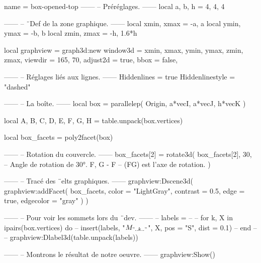 \documentclass[border = 3pt]{standalone}
\begin{document}
\begin{luadraw*}{name = box-opened-top}
------
-- Préréglages.
------
local a, b, h = 4, 4, 4

------
-- ¨Def de la zone graphique.
------
local xmin, xmax = -a, a
local ymin, ymax = -b, b
local zmin, zmax = -h, 1.6*h

local graphview = graph3d:new{
  window3d = {xmin, xmax, ymin, ymax, zmin, zmax},
  viewdir = {165, 70},
  adjust2d = true,
  bbox     = false,
}

------
-- Réglages liés aux lignes.
------
Hiddenlines     = true
Hiddenlinestyle = "dashed"

------
-- La boîte.
------
local box = parallelep(
  Origin,
  a*vecI, a*vecJ, h*vecK
)

local A, B, C, D, E, F, G, H = table.unpack(box.vertices)

local box_facets = poly2facet(box)

------
-- Rotation du couvercle.
------
box_facets[2] = rotate3d(
  box_facets[2],
  30,         -- Angle de rotation de 30°.
  {F, G - F}  -- (FG) est l'axe de rotation.
)

------
-- Tracé des ¨elts graphiques.
------
graphview:Dscene3d(
  graphview:addFacet(
    box_facets,
    {
      color     = "LightGray",
      contrast  = 0.5,
      edge      = true,
      edgecolor = "gray"
    }
  )
)

------
-- Pour voir les sommets lors du ¨dev.
------
-- labels = {}
--
-- for k, X in ipairs(box.vertices) do
--   insert(labels, {"$M_{".. k .."}$", X, {pos = "S", dist = 0.1}})
-- end
--
-- graphview:Dlabel3d(table.unpack(labels))

------
-- Montrons le résultat de notre oeuvre.
------
graphview:Show()
\end{luadraw*}
\end{document}
